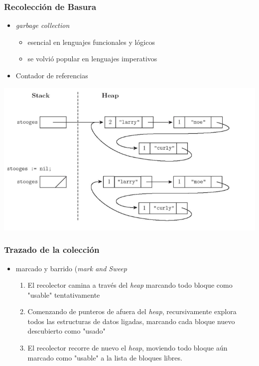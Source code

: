 \documentclass[11pt]{article}
\begin{document}
\subsubsection*{Recolección de Basura}
\label{sec:orgheadline15}
\begin{itemize}
\item \emph{garbage collection}
\begin{itemize}
\item esencial en lenguajes funcionales y lógicos
\item se volvió popular en lenguajes imperativos
\end{itemize}
\item Contador de referencias
\end{itemize}

\includegraphics[width=.9\linewidth]{contadref.png}

\subsubsection*{Trazado de la colección}
\label{sec:orgheadline16}
\begin{itemize}
\item marcado y barrido (\emph{mark and Sweep}
\begin{enumerate}
\item El recolector camina a través del \emph{heap} marcando todo bloque como
"usable" tentativamente
\item Comenzando de punteros de afuera del \emph{heap}, recursivamente
explora todos las estructuras de datos ligadas, marcando cada
bloque nuevo descubierto como "usado"
\item El recolector recorre de nuevo el \emph{heap}, moviendo todo bloque
aún marcado como "usable" a la lista de bloques libres.
\end{enumerate}
\end{itemize}
\end{document}
